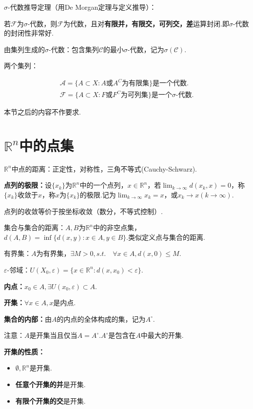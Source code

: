 \documentclass[bwprint, withoutpreface]{cumcmthesis}
\begin{document}
$\sigma$-代数推导定理（用De Morgan定理与定义推导）：

\indent 若$\mathcal{F}$为$\sigma$-代数，则$\mathcal{F}$为代数，且对\textbf{有限并，有限交，可列交，差}运算封闭.即$\sigma$-代数的封闭性非常好.

由集列生成的$\sigma$-代数：包含集列$\mathcal{C}$的最小$\sigma$-代数，记为$\sigma(\mathcal{C})$.

两个集列：

\begin{align*}
	\mathcal{A} = \{A \subset X: A \mbox{或} A^C \mbox{为有限集}\}\mbox{是一个代数.} \\ 
	\mathcal{F} = \{A \subset X: F \mbox{或} F^C \mbox{为可列集}\}\mbox{是一个$\sigma$-代数.}
\end{align*}

本节之后的内容不作要求.

\section{$\mathbb{R}^n$中的点集}
\indent	$\mathbb{R}^n$中点的距离：正定性，对称性，三角不等式(Cauchy-Schwarz).

\textbf{点列的极限：}设$\{x_k\}$为$\mathbb{R}^n$中的一个点列，$x \in \mathbb{R}^n$，若$\lim_{k \to \infty} d(x_k, x) = 0$，称$\{x_k\}$收敛于$x$，称$x$为$\{x_k\}$的极限.记为$\lim_{k \to \infty}{x_k} = x$，或$x_k \to x(k \to \infty)$.

点列的收敛等价于按坐标收敛（数分，不等式控制）.

集合与集合的距离：$A, B$为$\mathbb{R}^n$中的非空点集，$d(A, B) = \inf{\{d(x, y): x \in A, y \in B\}}$.类似定义点与集合的距离.

有界集：$A$为有界集，$\exists M > 0, s.t. \quad \forall x \in A, d(x, 0) \leqslant M$.

$\varepsilon$-邻域：$U(X_0,\varepsilon) = \{x \in \mathbb{R}^n: d(x, x_0) < \varepsilon\}$.

\textbf{内点：}$x_0 \in A, \exists U(x_0, \varepsilon) \subset A$.

\textbf{开集：}$\forall x \in A, x$是内点.

\textbf{集合的内部：}由$A$的内点的全体构成的集，记为$A^\circ$.

注意：$A$是开集当且仅当$A = A^\circ$.$A^\circ$是包含在$A$中最大的开集.

\textbf{开集的性质：}
\begin{itemize}[itemindent=2em]
	\item $\emptyset, \mathbb{R}^n$是开集.
	\item \textbf{任意个开集的并}是开集.
	\item \textbf{有限个开集的交}是开集. 
\end{itemize}
\end{document}
